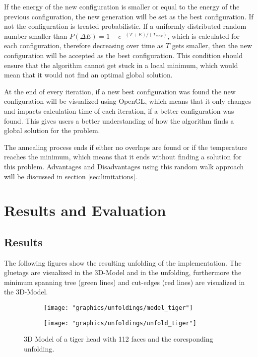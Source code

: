 \documentclass[draft,final]{vutinfth} %
\begin{document}
If the energy of the new configuration is smaller or equal to the energy of the previous configuration, the new generation will be set as the best configuration. If not the configuration is treated probabilistic. If a uniformly distributed random number smaller than $P(\Delta E) = 1 - e^{-(T + E)/(T_{max})}$, which is calculated for each configuration, therefore decreasing over time as $T$ gets smaller, then the new configuration will be accepted as the best configuration. This condition should ensure that the algorithm cannot get stuck in a local minimum, which would mean that it would not find an optimal global solution.

At the end of every iteration, if a new best configuration was found the new configuration will be visualized using OpenGL, which means that it only changes and impacts calculation time of each iteration, if a better configuration was found. This gives users a better understanding of how the algorithm finds a global solution for the problem.

The annealing process ends if either no overlaps are found or if the temperature reaches the minimum, which means that it ends without finding a solution for this problem. Advantages and Disadvantages using this random walk approach will be discussed in section \ref{sec:limitations}.

\chapter{Results and Evaluation}
\label{chap:reseval}

\section{Results}
The following figures show the resulting unfolding of the implementation. The gluetags are visualized in the 3D-Model and in the unfolding, furthermore the minimum spanning tree (green lines) and cut-edges (red lines) are visualized in the 3D-Model.

\begin{figure}
  \begin{subfigure}[b]{0.5\textwidth}
    \texttt{[image: "graphics/unfoldings/model\_tiger"]}
  \end{subfigure}
  \begin{subfigure}[b]{0.5\textwidth}
    \texttt{[image: "graphics/unfoldings/unfold\_tiger"]}
  \end{subfigure}
  
  \caption{3D Model of a tiger head with 112 faces and the coresponding unfolding.}
  \label{fig:tiger}
\end{figure}
\end{document}
